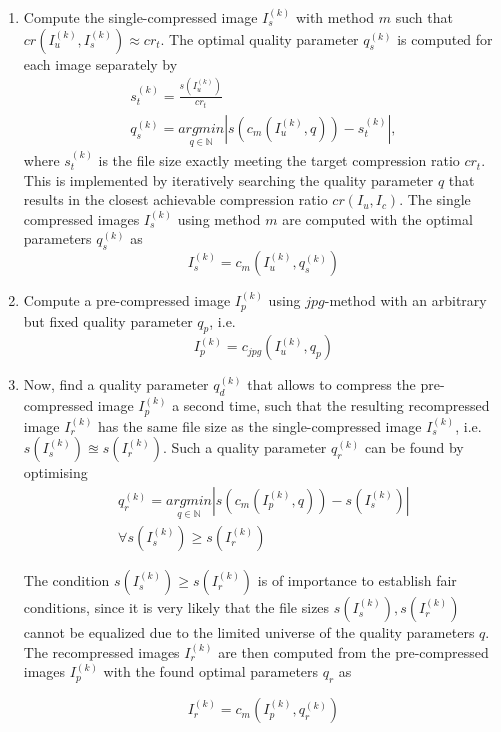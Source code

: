 \documentclass[10pt,twocolumn,letterpaper]{article}
\begin{document}
\begin{enumerate}
	\item Compute the single-compressed image $I_s^{(k)}$ with method $m$ such that $cr(I_u^{(k)}, I_s^{(k)}) \approx cr_t$. The optimal quality parameter $q_s^{(k)}$ is computed for each image separately by
	\begin{eqnarray}
	s_t^{(k)} = \frac{s(I_u^{(k)})}{cr_t} \\
	q_s^{(k)} = \underset{q \in \mathbb{N}}{argmin}|s(c_m(I_u^{(k)},q)) - s_t^{(k)}|,
	\end{eqnarray} where $s_t^{(k)}$ is the file size exactly meeting the target compression ratio $cr_t$. This is implemented by iteratively searching the quality parameter $q$ that results in the closest achievable compression ratio $cr(I_u, I_c)$. The single compressed images $I_s^{(k)}$ using method $m$ are computed with the optimal parameters $ q_s^{(k)}$ as
	\begin{equation}
	I_s^{(k)} = c_m(I_u^{(k)}, q_s^{(k)})
	\end{equation}
	
	\item Compute a pre-compressed image $I_p^{(k)}$ using $jpg$-method with an arbitrary but fixed quality parameter $q_p$, i.e. 
	\begin{equation}
		I_p^{(k)} = c_{jpg}(I_u^{(k)}, q_p)
	\end{equation}
	
	\item Now, find a quality parameter $q_d^{(k)}$ that allows to compress the pre-compressed image $I_p^{(k)}$ a second time, such that the resulting recompressed image $I_r^{(k)}$ has the same file size as the single-compressed image $I_s^{(k)}$, i.e. $s(I_s^{(k)}) \approxeq s(I_r^{(k)})$. Such a quality parameter $q_r^{(k)}$ can be found by optimising
	\begin{eqnarray}	
		q_r^{(k)} = \underset{q \in \mathbb{N}}{argmin}|s(c_m(I_p^{(k)},q)) - s(I_s^{(k)})| \\
		\forall s(I_s^{(k)}) \geq s(I_r^{(k)})
		\label{equ:recomp}
	\end{eqnarray}
	
The condition $s(I_s^{(k)}) \geq s(I_r^{(k)})$ is of importance to establish fair conditions, since it is very likely that the file sizes $s(I_s^{(k)}), s(I_r^{(k)})$  cannot be equalized due to the limited universe of the quality parameters $q$. The recompressed images $I_r^{(k)}$ are then computed from the pre-compressed images $I_p^{(k)}$ with the found optimal parameters $q_r$ as

	\begin{equation}
	I_r^{(k)} = c_m(I_p^{(k)}, q_r^{(k)})
	\end{equation}
\end{enumerate}
\end{document}
